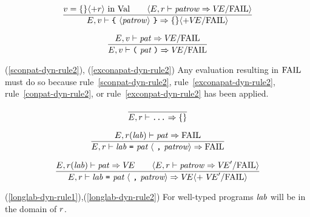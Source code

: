 \begin{equation}	%
\frac{\V=\emptymap\langle+\r\rangle\ \In\ \Val\qquad
      \langle\E,\r\ts\labpats\ra\VE/\fail\rangle}
     {\E,\V\ts\lttbrace\ \langle\labpats\rangle\ \rttbrace\ra\emptymap\langle+\VE/\fail\rangle}
\end{equation}

\begin{equation}	%
\frac{\E,\V\ts\pat\ra\VE/\fail}
     {\E,\V\ts\parpat\ra\VE/\fail}\index{56.1}
\end{equation}

\comments
\begin{description}
\item{(\ref{sconpat-dyn-rule2}),
\deletion{\theidstatus}{(\ref{conapat-dyn-rule2}),}
(\ref{exconapat-dyn-rule2})}
  Any evaluation resulting in ${\rm FAIL}$ must do so because 
rule~\ref{sconpat-dyn-rule2},
rule~\ref{exconapat-dyn-rule2},
rule~\ref{conpat-dyn-rule2},
or rule~\ref{exconpat-dyn-rule2} has been
applied.
\end{description}

\begin{equation}	%
\frac{}
     {\E,\r\ts\wildrec\ra\emptymap}\index{56.2}
\end{equation}
 

\begin{equation}	%
\label{longlab-dyn-rule1}
\frac{\E,\r(\lab)\ts\pat\ra\FAIL}
     {\E,\r\ts\longlabpats\ra\FAIL}
\end{equation}

\begin{equation}	%
\label{longlab-dyn-rule2}
\frac{\E,\r(\lab)\ts\pat\ra\VE\qquad
      \langle\E,\r\ts\labpats\ra\VE'/\fail\rangle }
     {\E,\r\ts\longlabpats\ra
      \VE\langle +\ \VE'/\fail\rangle}
\end{equation}
\comments
\begin{description}
\item{(\ref{longlab-dyn-rule1}),(\ref{longlab-dyn-rule2})}
For well-typed programs ${\it lab}$ will be in the domain of $r$.
\end{description}


